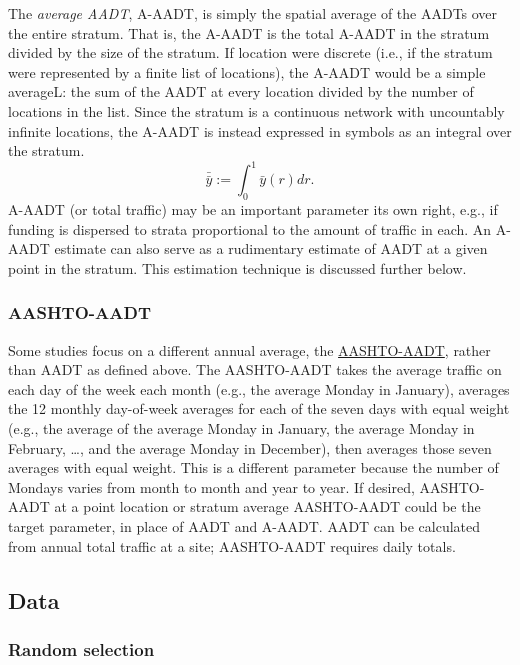 \documentclass[11pt]{article}
\begin{document}
The \emph{average AADT}, A-AADT, is simply the spatial average of the
AADTs over the entire stratum. That is, the A-AADT is the total A-AADT
in the stratum divided by the size of the stratum. If location were
discrete (i.e., if the stratum were represented by a finite list of
locations), the A-AADT would be a simple averageL: the sum of the AADT
at every location divided by the number of locations in the list. Since
the stratum is a continuous network with uncountably infinite locations,
the A-AADT is instead expressed in symbols as an integral over the
stratum. \[
\bar{\bar{y}} := \int_0^1 \bar{y}(r) dr.
\] A-AADT (or total traffic) may be an important parameter its own
right, e.g., if funding is dispersed to strata proportional to the
amount of traffic in each. An A-AADT estimate can also serve as a
rudimentary estimate of AADT at a given point in the stratum. This
estimation technique is discussed further below.

    \subsubsection{AASHTO-AADT}\label{aashto-aadt}

Some studies focus on a different annual average, the
\href{https://www.fhwa.dot.gov/policyinformation/tmguide/tmg_2022/Appendix-L-AASHTO-AADT-Calculation.pdf}{AASHTO-AADT},
rather than AADT as defined above. The AASHTO-AADT takes the average
traffic on each day of the week each month (e.g., the average Monday in
January), averages the 12 monthly day-of-week averages for each of the
seven days with equal weight (e.g., the average of the average Monday in
January, the average Monday in February, \ldots, and the average Monday
in December), then averages those seven averages with equal weight. This
is a different parameter because the number of Mondays varies from month
to month and year to year. If desired, AASHTO-AADT at a point location
or stratum average AASHTO-AADT could be the target parameter, in place
of AADT and A-AADT. AADT can be calculated from annual total traffic at
a site; AASHTO-AADT requires daily totals.

    \subsection{Data}\label{data}

\subsubsection{Random selection}\label{random-selection}
\end{document}
